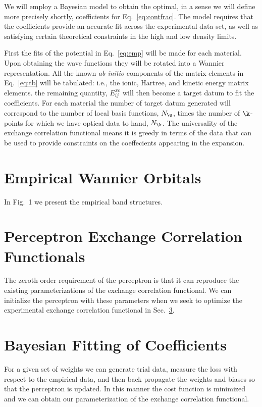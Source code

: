 We will employ a Bayesian model to obtain the optimal, in a sense we will define more precisely shortly,  
coefficients for Eq.~\ref{eq:contfrac}. The model requires that the coefficients provide an accurate fit 
across the experimental data set, as well as satisfying certain theoretical constraints in the high and low density limits.

First the fits of the potential in Eq.~\ref{eq:emp} will be made for each material. Upon obtaining the wave functions
they will be rotated into a Wannier representation. All the known {\it ab initio} components of the matrix elements
in Eq.~\ref{eq:tb} will be tabulated: i.e., the ionic, Hartree, and kinetic energy matrix elements. the remaining quantity,
$E^{xc}_{ij}$ will then become a target datum to fit the coefficients. For each material the number of target datum
generated will correspond to the number of local basis functions, $N_{\w}$, times the number of $\k$-points for which
we have optical data to hand, $N_{\k}$. The universality of the exchange correlation functional means it is greedy in
terms of the data that can be used to provide constraints on the coeffecients appearing in the expansion.

\section{Empirical Wannier Orbitals}
In Fig.~1 we present the empirical band structures.

\section{Perceptron Exchange Correlation Functionals}
The zeroth order requirement of the perceptron is that it can reproduce the existing parameterizations
of the exchange correlation functional. We can initialize the perceptron with these parameters when
we seek to optimize the experimental exchange correlation functional in Sec.~\ref{sec:bayesvxc}.

\section{Bayesian Fitting of Coefficients}
\label{sec:bayesvxc}
For a given set of weights we can generate trial data, measure the loss with respect to the empirical data,
and then back propagate the weights and biases so that the perceptron is updated. 
In this manner the cost function is minimized and we can obtain our parameterization of the exchange correlation functional.

